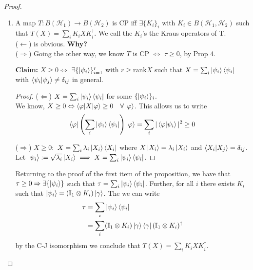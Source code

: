 \documentclass[10pt,oneside,longbibliography]{report}
\begin{document}
\begin{tcolorbox}[colframe=black,breakable, colback=black!5, arc=0pt, outer arc=0pt,boxrule=0.5pt]
\begin{proof}
\begin{enumerate}
    \item A map $T:B(\mathcal{H}_1)\rightarrow B(\mathcal{H}_2)$ is CP iff $\exists \{K_i\}_i$ with $K_i \in B(\mathcal{H}_1,\mathcal{H}_2)$ such that $T(X) = \sum_i K_i X K_i^{\dagger}$. We call the $K_i$'s the Kraus operators of T.\\
    
    ($\leftarrow$) is obvious. \textbf{Why?}\\
    
    ($\Rightarrow$) Going the other way, we know $T$ is CP $\Leftrightarrow$ $\tau \geq 0$, by Prop 4. 
    
    \textbf{Claim:} $X\geq 0 \Leftrightarrow$ $\exists \{\ket{\psi_i}\}_{i=1}^r$ with $r \geq \text{rank} X$ such that $X=\sum_i \ket{\psi_i}\bra{\psi_i}$ with $\braket{\psi_i | \psi_j} \neq \delta_{ij}$ in general. 
    \begin{proof}
    ($\Leftarrow$) $X = \sum_i \ket{\psi_i}\bra{\psi_i}$ for some $\{\ket{\psi_i}\}_i$. \\
    
    We know, $X \geq 0 \Leftrightarrow \braket{\varphi|X|\varphi} \geq 0 \quad \forall \ket{\varphi}$. This allows us to write
    \begin{align}
        \bra{\varphi}\left(\sum_i \ket{\psi_i}\bra{\psi_i}\right)\ket{\varphi} = \sum_i |\braket{\varphi|\psi_i}|^2 \geq 0
    \end{align}
    
    ($\Rightarrow$) $X \geq 0: $ $X=\sum_i \lambda_i \ket{X_i}\bra{X_i}$ where $X\ket{X_i} = \lambda_i \ket{X_i}$ and $\braket{X_i | X_j} = \delta_{ij}$. Let $\ket{\psi_i}:= \sqrt{\lambda_i}\ket{X_i} \implies X=\sum_i \ket{\psi_i}\bra{\psi_i}$.
    \end{proof}
    Returning to the proof of the first item of the proposition, we have that $\tau \geq 0 \Rightarrow \exists \{\ket{\psi_i}\}$ such that $\tau = \sum_i \ket{\psi_i}\bra{\psi_i}$. Further, for all $i$ there exists $K_i$ such that $\ket{\psi_i} =(\mathbb{I}_1 \otimes K_i)\ket{\gamma}$. The we can write
    \begin{align}
        \tau &= \sum_i \ket{\psi_i}\bra{\psi_i} \\
        &= \sum_i (\mathbb{I}_1 \otimes K_i) \ket{\gamma} \bra{\gamma} (\mathbb{I}_1 \otimes K_i)^{\dagger}
    \end{align}
    by the C-J isomorphism we conclude that $T(X) = \sum_i K_i X K_i^{\dagger}$.
    

\end{enumerate}
\end{proof}
\end{tcolorbox}
\end{document}
